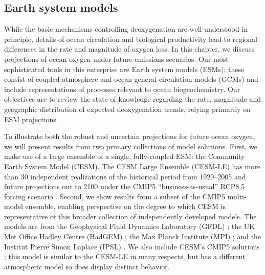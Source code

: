 \documentclass{report_chapter}
\begin{document}
\subsection{Earth system models}

While the basic mechanisms controlling deoxygenation are well-understood in principle, details of ocean circulation and biological productivity lead to regional differences in the rate and magnitude of oxygen loss.
In this chapter, we discuss projections of ocean oxygen under future emissions scenarios.
Our most sophisticated tools in this enterprise are Earth system models (ESMs); these consist of coupled atmosphere and ocean general circulation models (GCMs) and include representations of processes relevant to ocean biogeochemistry.
Our objectives are to review the state of knowledge regarding the rate, magnitude and geographic distribution of expected deoxygenation trends, relying primarily on ESM projections.

To illustrate both the robust and uncertain projections for future ocean oxygen, we will present results from two primary collections of model solutions.
First, we make use of a large ensemble of a single, fully-coupled ESM: the Community Earth System Model (CESM).
The CESM Large Ensemble (CESM-LE) has more than 30 independent realizations of the historical period from 1920--2005 and future projections out to 2100 under  the CMIP5 ``business-as-usual'' RCP8.5 forcing scenario \citep{Kay-Deser-etal-2015}.
Second, we show results from a subset of the CMIP5 multi-model ensemble, enabling perspective on the degree to which CESM is representative of this broader collection of independently developed models.
The models are from the Geophysical Fluid Dynamics Laboratory (GFDL) \citep{Dunne-John-etal-2012a,Dunne-John-etal-2013b}; the UK Met Office Hadley Centre (HadGEM) \citep{Collins-Bellouin-etal-2011,HadGEM2-Development-Team-2011}; the Max Planck Institute (MPI) \citep{Giorgetta-Jungclaus-etal-2013}; and the Institut Pierre Simon Laplace (IPSL) \citep{Dufresne-Foujols-etal-2013}.
We also include CESM's CMIP5 solutions \citep{Hurrell-Holland-etal-2013}; this model is similar to the CESM-LE in many respects, but has a different atmospheric model so does display distinct behavior.
\end{document}
